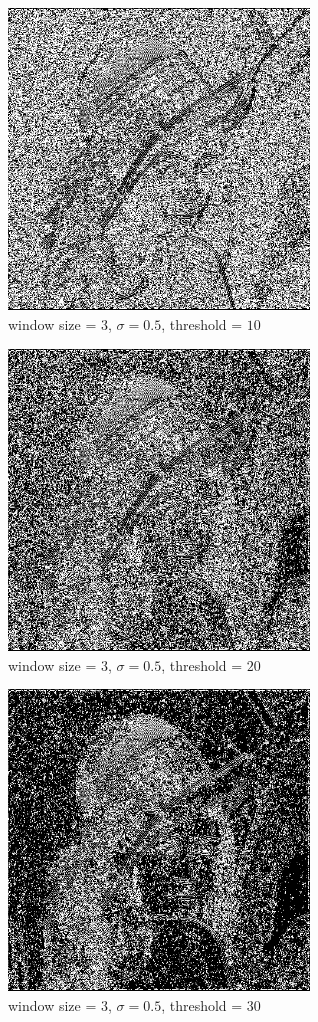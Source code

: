 \documentclass[conference]{IEEEtran}
\begin{document}
\begin{figure}[H]
\centerline{\includegraphics[width=8cm]{lena10.png}}
\caption{window size = $3$, $\sigma=0.5$,  threshold = $10$}
\label{lena10}
\end{figure}

\begin{figure}[H]
\centerline{\includegraphics[width=8cm]{lena11.png}}
\caption{window size = $3$, $\sigma=0.5$,  threshold = $20$}
\label{lena11}
\end{figure}

\begin{figure}[H]
\centerline{\includegraphics[width=8cm]{lena12.png}}
\caption{window size = $3$, $\sigma=0.5$,  threshold = $30$}
\label{lena12}
\end{figure}
\end{document}
